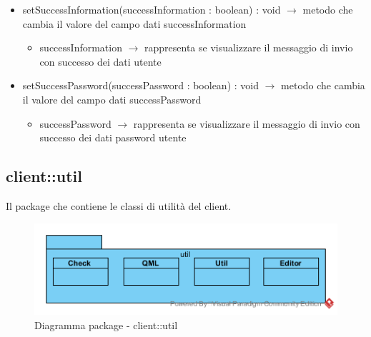 \begin{description}
\begin{itemize}
	\item setSuccessInformation(successInformation : boolean) : void $\rightarrow$ metodo che cambia il valore del campo dati successInformation\begin{itemize}
		\item successInformation $\rightarrow$ rappresenta se visualizzare il messaggio di invio con successo dei dati utente
	\end{itemize}
	
	\item setSuccessPassword(successPassword : boolean) : void $\rightarrow$ metodo che cambia il valore del campo dati successPassword\begin{itemize}
		\item successPassword $\rightarrow$ rappresenta se visualizzare il messaggio di invio con successo dei dati password utente
	\end{itemize}
	
\end{itemize}

\end{description}

\vspace{0.5cm}
\subsection{client::util}
Il package che contiene le classi di utilità del client.\begin{center}
	\begin{figure}[H]
		\centering \includegraphics[scale=4, max width=\textwidth, max height=\myheight]{../img/diagrammiClassi/client/util.png}
		\caption{Diagramma package - client::util}
	\end{figure}
\end{center}\hypertarget{client::util::Check}{}
